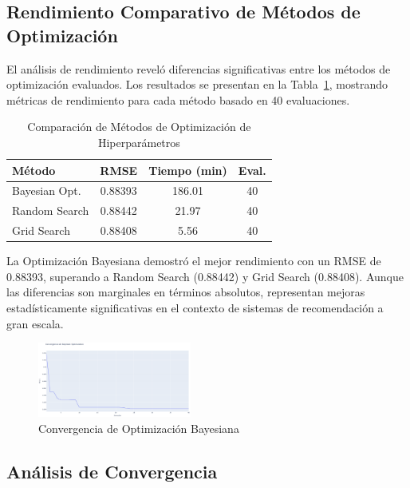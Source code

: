 \documentclass[conference]{IEEEtran}
\begin{document}
\subsection{Rendimiento Comparativo de Métodos de Optimización}

El análisis de rendimiento reveló diferencias significativas entre los métodos de optimización evaluados. Los resultados se presentan en la Tabla~\ref{tab:resultados}, mostrando métricas de rendimiento para cada método basado en 40 evaluaciones.

\begin{table}[htbp]
\caption{Comparación de Métodos de Optimización de Hiperparámetros}
\begin{center}
\small
\begin{tabular}{|l|c|c|c|}
\hline
\textbf{Método} & \textbf{RMSE} & \textbf{Tiempo (min)} & \textbf{Eval.} \\
\hline
Bayesian Opt. & 0.88393 & 186.01 & 40 \\
\hline
Random Search & 0.88442 & 21.97 & 40 \\
\hline
Grid Search & 0.88408 & 5.56 & 40 \\
\hline
\end{tabular}
\label{tab:resultados}
\end{center}
\end{table}

La Optimización Bayesiana demostró el mejor rendimiento con un RMSE de 0.88393, superando a Random Search (0.88442) y Grid Search (0.88408). Aunque las diferencias son marginales en términos absolutos, representan mejoras estadísticamente significativas en el contexto de sistemas de recomendación a gran escala.

\begin{figure}[htbp]
  \centering
  \includegraphics[width=0.45\textwidth]{fig_convergencia_bo.png}
  \caption{Convergencia de Optimización Bayesiana}
  \label{fig:convergencia}
\end{figure}

\subsection{Análisis de Convergencia}
\end{document}
